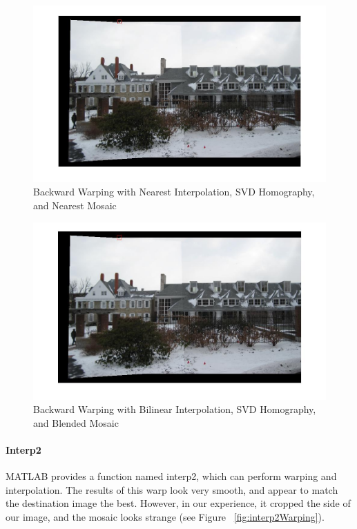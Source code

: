 \documentclass[11pt, letterpaper]{article}
\begin{document}
\begin{figure}[here]
\includegraphics[width=\textwidth]{../pics/snow-svd-backward-nearest-nearest.jpg}
\caption{Backward Warping with Nearest Interpolation, 
  SVD Homography, and Nearest Mosaic}
\label{fig:backwardNearestWarping}
\end{figure}

\begin{figure}[here]
\includegraphics[width=\textwidth]{../pics/snow-svd-backward-bilinear-nearest.jpg}
\caption{Backward Warping with Bilinear Interpolation, 
  SVD Homography, and Blended Mosaic}
\label{fig:backwardBilinearWarping}
\end{figure}


\paragraph{Interp2}
MATLAB provides a function named interp2, which can perform warping
and interpolation. The results of this warp look very smooth, and
appear to match the destination image the best. However, in our
experience, it cropped the side of our image, and the mosaic looks
strange (see Figure ~\ref{fig:interp2Warping}).
\end{document}
